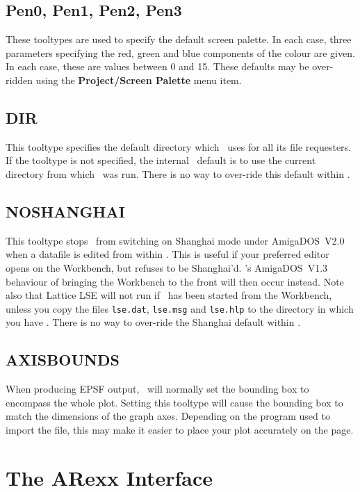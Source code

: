 \section{Pen0, Pen1, Pen2, Pen3}
These tooltypes are used to specify the default screen palette. In each case, three 
parameters specifying the red, green and blue components of the colour are given. In 
each case, these are values between 0 and 15.
These defaults may be over-ridden using the {\bf Project/Screen Palette} menu item.

\section{DIR}
This tooltype specifies the default directory which \amplot\ uses for all its file 
requesters. If the tooltype is not specified, the internal \amplot\ default is to 
use the current directory from which \amplot\ was run.
There is no way to over-ride this default within \amplot.

\section{NOSHANGHAI}
This tooltype stops \amplot\ from switching on Shanghai mode under AmigaDOS~V2.0 
when a datafile is edited from within \amplot. This is useful if your preferred 
editor opens on the Workbench, but refuses to be Shanghai'd. \amplot's AmigaDOS~V1.3
behaviour of bringing the Workbench to the front will then occur instead.
Note also that Lattice LSE will not run if \amplot\ has been started from the 
Workbench, unless you copy the files {\tt lse.dat}, {\tt lse.msg} and 
{\tt lse.hlp} to the directory in which you have \amplot.
There is no way to over-ride the Shanghai default within \amplot.

\section{AXISBOUNDS}
When producing EPSF output, \amplot\ will normally set the bounding box to encompass 
the whole plot. Setting this tooltype will cause the bounding box to match the 
dimensions of the graph axes. Depending on the program used to import the file, this 
may make it easier to place your plot accurately on the page.

\chapter{The ARexx Interface}
\label{ch:rxfit}

